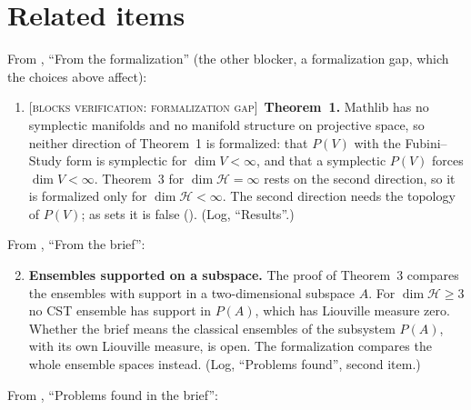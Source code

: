 \documentclass[11pt]{article}
\newcommand{\blocker}[1]{\textsc{[blocks verification: #1]}~}
\begin{document}
\section{Related items}\label{sec:related}
From , ``From the formalization'' (the other blocker, a formalization
gap, which the choices above affect):
\begin{enumerate}
\item \blocker{formalization gap}\textbf{Theorem~1.} Mathlib has no symplectic manifolds and no
  manifold structure on projective space, so neither direction of Theorem~1 is formalized: that
  $P(V)$ with the Fubini--Study form is symplectic for $\dim V < \infty$, and that a symplectic
  $P(V)$ forces $\dim V < \infty$. Theorem~3 for $\dim\mathcal H = \infty$ rests on the second
  direction, so it is formalized only for $\dim\mathcal H < \infty$. The second direction
  needs the topology of $P(V)$; as sets it is false ().
  (Log, ``Results''.)
\end{enumerate}
From , ``From the brief'':
\begin{enumerate}
\setcounter{enumi}{1}
\item \textbf{Ensembles supported on a subspace.} The proof of Theorem~3 compares the ensembles
  with support in a two-dimensional subspace $A$. For $\dim\mathcal H \ge 3$ no CST ensemble has
  support in $P(A)$, which has Liouville measure zero. Whether the brief means the classical
  ensembles of the subsystem $P(A)$, with its own Liouville measure, is open. The formalization
  compares the whole ensemble spaces instead. (Log, ``Problems found'', second item.)
\end{enumerate}
From , ``Problems found in the brief'':
\end{document}
